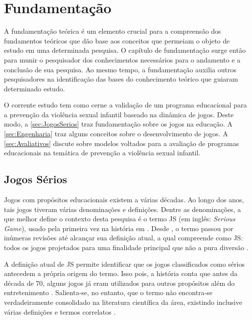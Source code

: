 \chapter{Fundamentação}\label{ch:Fundamentacao}

A fundamentação teórica é um elemento crucial para a compreensão dos fundamentos teóricos que dão base aos conceitos que permeiam o objeto de estudo em uma determinada pesquisa. O capítulo de fundamentação surge então para munir o pesquisador dos conhecimentos necessários para o andamento e a conclusão de sua pesquisa. Ao mesmo tempo, a fundamentação auxilia outros pesquisadores na identificação das bases do conhecimento teórico que guiaram determinado estudo. 

O corrente estudo tem como cerne a validação de um programa educacional para a prevenção da violência sexual infantil baseado na dinâmica de jogos. Deste modo, a \autoref{sec:JogosSerios} traz fundamentação sobre os jogos na educação. A \autoref{sec:Engenharia} traz alguns conceitos sobre o desenvolvimento de jogos. A \autoref{sec:Avaliativos} discute sobre modelos voltados para a avaliação de programas educacionais na temática de prevenção a violência sexual infantil.

\vspace{1.0 cm}
\section{Jogos Sérios}\label{sec:JogosSerios}

Jogos com propósitos educacionais existem a várias décadas. Ao longo dos anos, tais jogos tiveram várias denominações e definições. Dentre as denominações, a que melhor define o contexto desta pesquisa é o termo \ac{JS} (em inglês: \textit{Serious Game}), usado pela primeira vez na história em \citeyear{clark1970serious} \cite{djaouti12011origins}. Desde \citeyear{clark1970serious}, o termo passou por inúmeras revisões até alcançar sua definição atual, a qual compreende como \ac{JS}: todos os jogos projetados para uma finalidade principal que não a pura diversão \cite{michael2005serious, laamarti2014overview, carvalho2015aprendizagem}.

A definição atual de \ac{JS} permite identificar que os jogos classificados como sérios antecedem a própria origem do termo. Isso pois, a história conta que antes da década de 70, alguns jogos já eram utilizados para outros propósitos além do entretenimento \cite{wilkinson2015brief}. Salienta-se, no entanto, que o termo não encontra-se verdadeiramente consolidado na literatura científica da área, existindo inclusive várias definições e termos correlatos \cite{pourabdollahian2012serious}.


